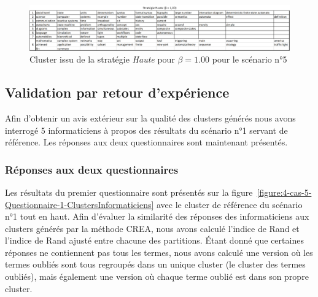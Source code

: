 \begin{figure}[htb!]
\centering
\centerline{  %
\includegraphics[scale=0.55]{4-Experiences/images/cas-6/clusters-Statecharts-S=H-B=1.00.png}
}
\caption{Cluster issu de la stratégie \textit{Haute} pour $ \beta = 1.00 $ pour le scénario n°5}
\label{figure:4-cas-6-PII-ClustersStrategieHaute-Beta-1}
\end{figure}



\clearpage %
\newpage   %


\subsection{Validation par retour d'expérience}
\label{subsection:Evaluation:DeroulementExperimentations:ValidationREX}

Afin d'obtenir un avis extérieur sur la qualité des clusters générés nous avons interrogé 5 informaticiens à propos des résultats du scénario n°1 servant de référence.
Les réponses aux deux questionnaires sont maintenant présentés.


\subsubsection{Réponses aux deux questionnaires}
\label{subsubsection:Evaluation:DeroulementExperimentations:ValidationREX:Questionnaires}

Les résultats du premier questionnaire sont présentés sur la figure~\ref{figure:4-cas-5-Questionnaire-1-ClustersInformaticiens} avec le cluster de référence du scénario n°1 tout en haut.
Afin d'évaluer la similarité des réponses des informaticiens aux clusters générés par la méthode CREA, nous avons calculé l'indice de Rand et l'indice de Rand ajusté entre chacune des partitions.
\'Etant donné que certaines réponses ne contiennent pas tous les termes, nous avons calculé une version où les termes oubliés sont tous regroupés dans un unique cluster (le cluster des termes oubliés), mais également une version où chaque terme oublié est dans son propre cluster.

